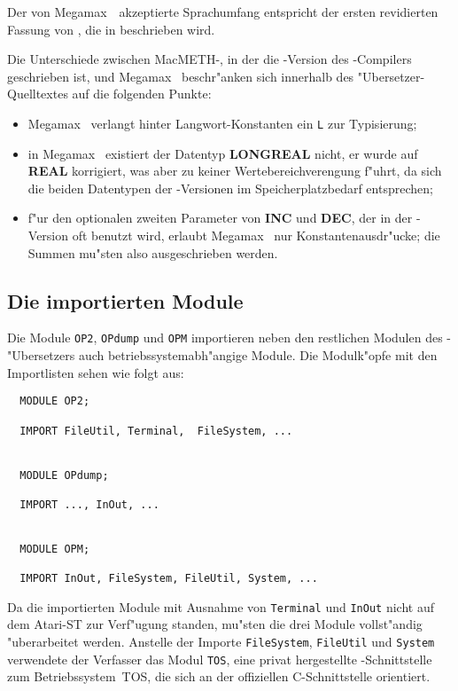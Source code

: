 Der von Megamax~\modula\ akzeptierte Sprachumfang entspricht der ersten
revidierten Fassung von \modula, die in \cite{modula2} beschrieben wird.

Die Unterschiede zwischen MacMETH-\modula, in der die \modula-Version des
\oberon-Compilers geschrieben ist, und Megamax \modula\ beschr"anken sich
innerhalb des "Ubersetzer-Quelltextes auf die folgenden Punkte:
\begin{itemize}
\item Megamax \modula\ verlangt hinter Langwort-Konstanten ein {\tt L}
   zur Typisierung;
\item in Megamax \modula\ existiert der Datentyp {\bf LONGREAL} nicht,
   er wurde auf {\bf REAL} korrigiert, was aber zu keiner
   Wertebereichverengung f"uhrt, da sich die beiden Datentypen der
   \modula-Versionen im Speicherplatzbedarf entsprechen;
\item f"ur den optionalen zweiten Parameter von {\bf INC} und {\bf DEC}, der
   in der \modula-Version oft benutzt wird, erlaubt Megamax \modula\
   nur Konstantenausdr"ucke;
   die Summen mu"sten also ausgeschrieben werden.
\end{itemize}

\subsection{Die importierten Module}

Die Module {\tt OP2}, {\tt OPdump} und {\tt OPM} importieren neben
den restlichen Modulen des \oberon-"Ubersetzers auch betriebssystemabh"angige
Module.
Die Modulk"opfe mit den Importlisten sehen wie folgt aus:

\begin{verbatim}
  MODULE OP2;

  IMPORT FileUtil, Terminal,  FileSystem, ...


  MODULE OPdump;

  IMPORT ..., InOut, ...


  MODULE OPM;

  IMPORT InOut, FileSystem, FileUtil, System, ...
\end{verbatim}

Da die importierten Module mit Ausnahme von {\tt Terminal} und {\tt InOut} nicht
auf dem Atari-ST zur Verf"ugung standen, mu"sten die drei Module vollst"andig
"uberarbeitet werden.
Anstelle der Importe {\tt FileSystem}, {\tt FileUtil} und {\tt System}
verwendete der Verfasser das Modul {\tt TOS}, eine privat hergestellte
\modula-Schnittstelle zum Betriebssystem~TOS, die sich an der offiziellen
C-Schnittstelle orientiert.

